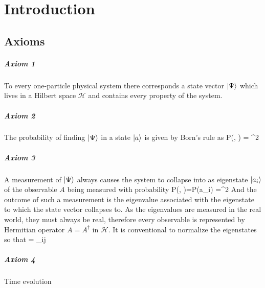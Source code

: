 \documentclass[oneside, 12pt, notitlepage]{book}
\begin{document}
\pagestyle{mynotespage}

\chapter{Introduction}

\section{Axioms}
\paragraph{Axiom 1}
To every one-particle physical system there corresponds a state vector \(\ket{\Psi}\) which lives in a Hilbert space \( \mathcal{H}\) and contains every property of the system.\par
\paragraph{Axiom 2}
The probability of finding \(\ket{\Psi}\) in a state \( \ket{a}\) is given by Born's rule as
\beq  P\left(\ket{\Psi}, \right) = ^2\eeq
\paragraph{Axiom 3}
A measurement of \(\ket{\Psi}\) always causes the system to collapse into as eigenstate \(\ket{a_i} \) of the observable \(A\) being measured with probability
\beq  P\left(\ket{\Psi}, \right)=P(a_i) =^2\eeq
And the outcome of such a measurement is the eigenvalue associated with the eigenstate to which the state vector collapses to. As the eigenvalues are measured in the real world, they must always be real, therefore every observable is represented by Hermitian operator \(A = A^{\dag} \) in \(\mathcal{H}\). It is conventional to normalize the eigenstates so that \beq  {} = \delta_{ij}\eeq \par
\paragraph{Axiom 4}
Time evolution\par
\end{document}

